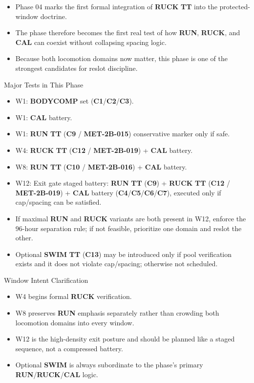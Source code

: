 \documentclass[10pt]{article}
\begin{document}
\begin{itemize}
\item Phase 04 marks the first formal integration of \textbf{RUCK} \textbf{TT} into the protected-window doctrine.
\item The phase therefore becomes the first real test of how \textbf{RUN}, \textbf{RUCK}, and \textbf{CAL} can coexist without collapsing spacing logic.
\item Because both locomotion domains now matter, this phase is one of the strongest candidates for reslot discipline.
\end{itemize}

Major Tests in This Phase

\begin{itemize}
\item W1: \textbf{BODYCOMP} set (\textbf{C1}/\textbf{C2}/\textbf{C3}).
\item W1: \textbf{CAL} battery.
\item W1: \textbf{RUN} \textbf{TT} (\textbf{C9} / \textbf{MET-2B-015}) conservative marker only if safe.
\item W4: \textbf{RUCK} \textbf{TT} (\textbf{C12} / \textbf{MET-2B-019}) + \textbf{CAL} battery.
\item W8: \textbf{RUN} \textbf{TT} (\textbf{C10} / \textbf{MET-2B-016}) + \textbf{CAL} battery.
\item W12: Exit gate staged battery: \textbf{RUN} \textbf{TT} (\textbf{C9}) + \textbf{RUCK} \textbf{TT} (\textbf{C12} / \textbf{MET-2B-019}) + \textbf{CAL} battery (\textbf{C4}/\textbf{C5}/\textbf{C6}/\textbf{C7}), executed only if cap/spacing can be satisfied.
\item If maximal \textbf{RUN} and \textbf{RUCK} variants are both present in W12, enforce the 96-hour separation rule; if not feasible, prioritize one domain and reslot the other.
\item Optional \textbf{SWIM} \textbf{TT} (\textbf{C13}) may be introduced only if pool verification exists and it does not violate cap/spacing; otherwise not scheduled.
\end{itemize}

Window Intent Clarification

\begin{itemize}
\item W4 begins formal \textbf{RUCK} verification.
\item W8 preserves \textbf{RUN} emphasis separately rather than crowding both locomotion domains into every window.
\item W12 is the high-density exit posture and should be planned like a staged sequence, not a compressed battery.
\item Optional \textbf{SWIM} is always subordinate to the phase’s primary \textbf{RUN}/\textbf{RUCK}/\textbf{CAL} logic.
\end{itemize}
\end{document}
